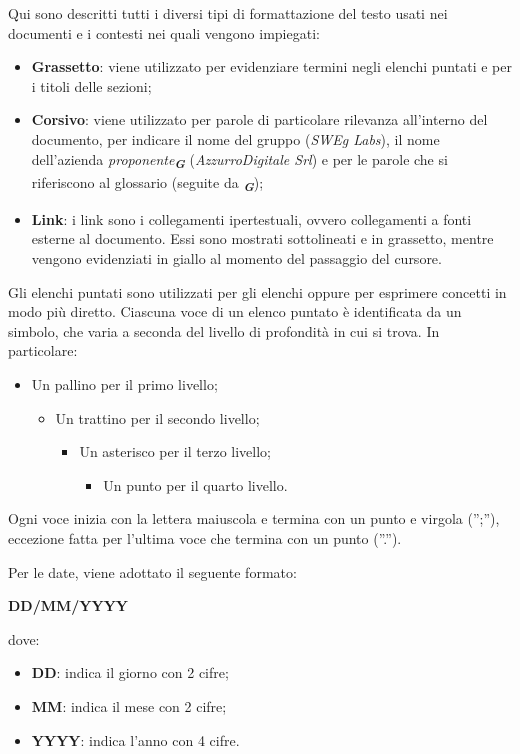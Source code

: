 Qui sono descritti tutti i diversi tipi di formattazione del testo usati nei documenti e i contesti
nei quali vengono impiegati:
\begin{itemize}
    \item \textbf{Grassetto}: viene utilizzato per evidenziare termini negli elenchi puntati e per i titoli
    delle sezioni;
    \item \textbf{Corsivo}: viene utilizzato per parole di particolare rilevanza all’interno del documento, 
    per indicare il nome del gruppo (\emph{SWEg Labs}), il nome dell’azienda \emph{proponente}\textsubscript{\textit{\textbf{G}}} 
    (\emph{AzzurroDigitale Srl}) e per le parole che si riferiscono al glossario (seguite da \textsubscript{\textit{\textbf{G}}});
    \item \textbf{Link}: i link sono i collegamenti ipertestuali, ovvero collegamenti a fonti esterne al
    documento. Essi sono mostrati sottolineati e in grassetto, mentre vengono evidenziati in giallo
    al momento del passaggio del cursore.
\end{itemize}

Gli elenchi puntati sono utilizzati per gli elenchi oppure per esprimere concetti in modo più
diretto. Ciascuna voce di un elenco puntato è identificata da un simbolo, che varia a seconda
del livello di profondità in cui si trova. In particolare:
\begin{itemize}
    \item Un pallino per il primo livello;
    \begin{itemize}
        \item Un trattino per il secondo livello;
        \begin{itemize}
            \item Un asterisco per il terzo livello;
            \begin{itemize}
                \item Un punto per il quarto livello.
            \end{itemize}
        \end{itemize}
    \end{itemize}
\end{itemize}
Ogni voce inizia con la lettera maiuscola e termina con un punto e virgola (”;”), eccezione
fatta per l’ultima voce che termina con un punto (”.”).

Per le date, viene adottato il seguente formato:
\begin{center}
    \textbf{DD/MM/YYYY}
\end{center}
dove:
\begin{itemize}
    \item \textbf{DD}: indica il giorno con 2 cifre;
    \item \textbf{MM}: indica il mese con 2 cifre;
    \item \textbf{YYYY}: indica l’anno con 4 cifre.
\end{itemize}

